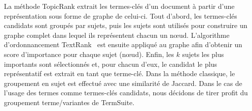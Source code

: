     La méthode TopicRank extrait les termes-clés d'un document à partir d'une
    représentation sous forme de graphe de celui-ci. Tout d'abord, les
    termes-clés candidats sont groupés par sujets, puis les sujets sont utilisés
    pour construire un graphe complet dans lequel ils représentent chacun un
    n\oe{}ud. L'algorithme d'ordonnancement
    TextRank~\cite{mihalcea2004textrank} est ensuite appliqué au graphe afin
    d'obtenir un score d'importance pour chaque sujet (n\oe{}ud). Enfin, les $k$
    sujets les plus importants sont sélectionnés et, pour chacun d'eux, le
    candidat le plus représentatif est extrait en tant que terme-clé. Dans la
    méthode classique, le groupement en sujet est effectué avec une similarité
    de Jaccard. Dans le cas de l'usage des termes comme termes-clés candidats,
    nous décidons de tirer profit du groupement terme/variantes de TermSuite.

